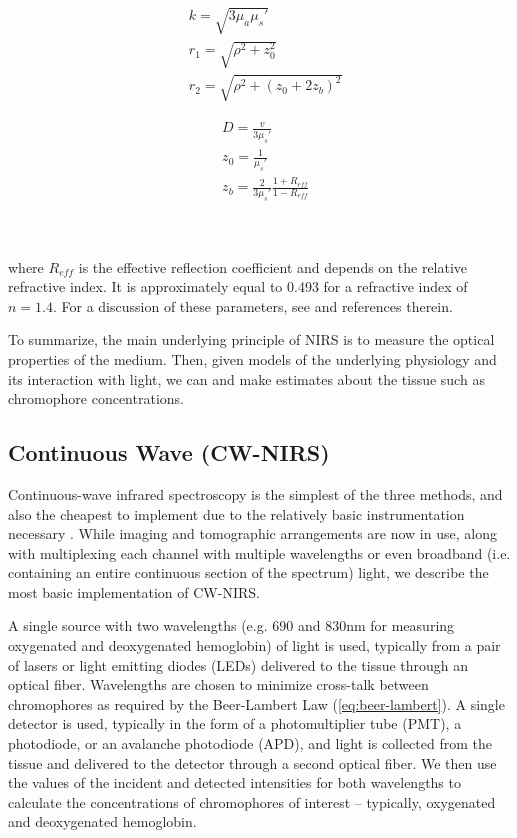 \begin{minipage}{0.4\textwidth}
    \centering
    \begin{align}
        &k = \sqrt{3 \mu_a \mu_s'} \\
        &r_1 = \sqrt{\rho^2+z_0^2} \label{eq:flux_vars_first}\\ 
        &r_2 = \sqrt{\rho^2+(z_0+2z_b)^2} 
    \end{align}
\end{minipage}\hspace*{\fill}%
\begin{minipage}{0.4\textwidth}
    \centering
    \begin{align}
        &D = \frac{v}{3\mu_s'} \\
        &z_0 = \frac{1}{\mu_s'}\\
        &z_b = \frac{2}{3\mu_s'}\frac{1+R_{eff}}{1-R_{eff}} \label{eq:flux_vars_last}
    \end{align}
\end{minipage}
\\
\\
\noindent where $R_{eff}$ is the effective reflection coefficient and depends on the relative refractive index. It is approximately equal to 0.493 for a refractive index of $n=1.4$. For a discussion of these parameters, see \cite{Farrell1992} and references therein.

To summarize, the main underlying principle of NIRS is to measure the optical properties of the medium. Then, given models of the underlying physiology and its interaction with light, we can and make estimates about the tissue such as chromophore concentrations. 

\subsection{Continuous Wave (CW-NIRS)} \label{sec:CW-NIRS}
Continuous-wave infrared spectroscopy is the simplest of the three methods, and also the cheapest to implement due to the relatively basic instrumentation necessary \cite{Scholkmann2013}. While imaging and tomographic arrangements are now in use, along with multiplexing each channel with multiple wavelengths or even broadband (i.e. containing an entire continuous section of the spectrum) light, we describe the most basic implementation of CW-NIRS. 

A single source with two wavelengths (e.g. 690 and 830nm for measuring oxygenated and deoxygenated hemoglobin) of light is used, typically from a pair of lasers or light emitting diodes (LEDs) delivered to the tissue through an optical fiber. Wavelengths are chosen to minimize cross-talk between chromophores as required by the Beer-Lambert Law (\autoref{eq:beer-lambert}). A single detector is used, typically in the form of a photomultiplier tube (PMT), a photodiode, or an avalanche photodiode (APD), and light is collected from the tissue and delivered to the detector through a second optical fiber. We then use the values of the incident and detected intensities for both wavelengths to calculate the concentrations of chromophores of interest -- typically, oxygenated and deoxygenated hemoglobin.

